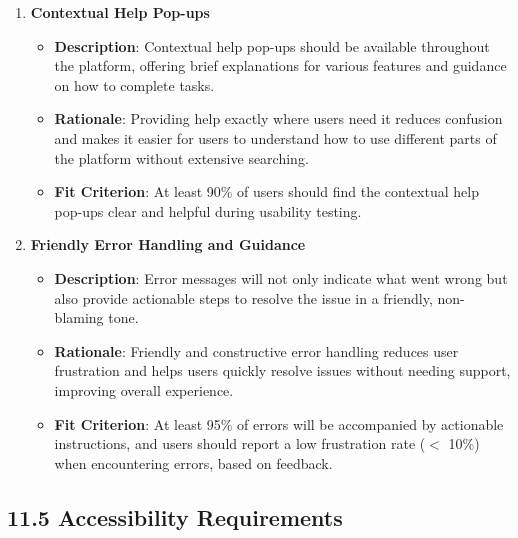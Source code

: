 \documentclass[12pt]{article}
\begin{document}
\begin{enumerate}
    \item \textbf{Contextual Help Pop-ups}  
        \begin{itemize}[leftmargin=2cm]
            \item \textbf{Description}: Contextual help pop-ups should be available throughout the platform, offering brief explanations for various features and guidance on how to complete tasks.  
            \item \textbf{Rationale}: Providing help exactly where users need it reduces confusion and makes it easier for users to understand how to use different parts of the platform without extensive searching.  
            \item \textbf{Fit Criterion}: At least 90\% of users should find the contextual help pop-ups clear and helpful during usability testing.
        \end{itemize}
    \item \textbf{Friendly Error Handling and Guidance}  
        \begin{itemize}[leftmargin=2cm]
            \item \textbf{Description}: Error messages will not only indicate what went wrong but also provide actionable steps to resolve the issue in a friendly, non-blaming tone.  
            \item \textbf{Rationale}: Friendly and constructive error handling reduces user frustration and helps users quickly resolve issues without needing support, improving overall experience.  
            \item \textbf{Fit Criterion}: At least 95\% of errors will be accompanied by actionable instructions, and users should report a low frustration rate ($<$ 10\%) when encountering errors, based on feedback.
        \end{itemize}
\end{enumerate}

\subsection*{11.5 Accessibility Requirements}
\end{document}
